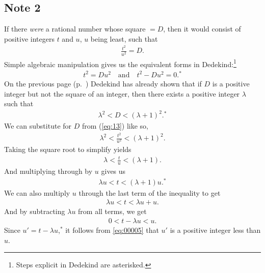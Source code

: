 \documentclass[polutonikogreek,english,twoside,openright]{article}
\begin{document}
\subsection*{Note 2}\label{note2}

If there \emph{were} a rational number whose square $=D$, then it
would consist of positive integers $t$ and $u$, $u$ being least, such
that
\begin{align}
  \frac{t^2}{u^2}=D.\label{eq:13}
\end{align}
Simple algebraic manipulation gives us the equivalent forms in
Dedekind:\footnote{Steps explicit in Dedekind are asterisked.}
\begin{align}
  \label{eq:14}
  t^2=Du^2 \quad \mathrm{and} \quad t^2-Du^2=0.^* 
\end{align}
On the previous page (p.~\pageref{DposNotSq}) Dedekind has already
shown that if $D$ is a positive integer but not the square of an
integer, then there exists a positive integer $\lambda$ such that
\begin{align}
  \label{eq:1}
  \lambda^2<D<(\lambda + 1)^2.^*
\end{align}
We can substitute for $D$ from (\ref{eq:13}) like
so,
\begin{align}
\label{eq:2}
  \lambda^2 < \frac{t^2}{u^2} < (\lambda + 1)^2.
\end{align}
Taking the square root to simplify yields
\begin{align}
\label{eq:3}
  \lambda < \frac{t}{u} < (\lambda + 1).
\end{align}
And multiplying through by $u$ gives us
\begin{align}
\label{eq:4}
  \lambda u < t < (\lambda + 1)u.^*
\end{align}
We can also multiply $u$ through the last term of the inequality
to get
\begin{align}
\label{eq:5}
 \lambda u < t < \lambda u + u. 
\end{align}
And by subtracting $\lambda u$ from all terms, we get
\begin{align}
  \label{eq:00005}
  0<t-\lambda u<u.
\end{align}
Since $u'=t-\lambda u$,$^*$ it follows from
\eqref{eq:00005} that $u'$ is a positive integer less than
$u$.
\end{document}
